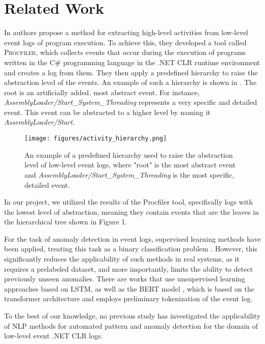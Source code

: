 \section{Related Work}
\label{sec:related}

In \cite{stepanov2024extracting} authors propose a method for extracting high-level activities from low-level event logs of program execution. To achieve this, they developed a tool called \textsc{Procfiler}, which collects events that occur during the execution of programs written in the C\# programming language in the .NET CLR runtime environment and creates a log from them. They then apply a predefined hierarchy to raise the abstraction level of the events. An example of such a hierarchy is shown in . The root is an artificially added, most abstract event. For instance, \textit{AssemblyLoader/Start\_System\_Threading} represents a very specific and detailed event. This event can be abstracted to a higher level by naming it \textit{AssemblyLoader/Start}.

\begin{figure}
  \centering
  \texttt{[image: figures/activity\_hierarchy.png]}
  \caption{An example of a predefined hierarchy used to raise the abstraction level of low-level event logs, where "root" is the most abstract event and \textit{AssemblyLoader/Start\_System\_Threading} is the most specific, detailed event.}
  \Description{}
  \label{fig:hierarchy}
\end{figure}

In our project, we utilized the results of the Procfiler tool, specifically logs with the lowest level of abstraction, meaning they contain events that are the leaves in the hierarchical tree shown in Figure 1.

For the task of anomaly detection in event logs, supervised learning methods have been applied, treating this task as a binary classification problem \cite{huang2020hitanomaly}. However, this significantly reduces the applicability of such methods in real systems, as it requires a prelabeled dataset, and more importantly, limits the ability to detect previously unseen anomalies. There are works that use unsupervised learning approaches \cite{du2017deeplog} based on LSTM, as well as the \textsc{BERT} model \cite{lee2023lanobert}, which is based on the transformer architecture and employs preliminary tokenization of the event log.

To the best of our knowledge, no previous study has investigated the applicability of NLP methods for automated pattern and anomaly detection for the domain of low-level event .NET CLR logs.
